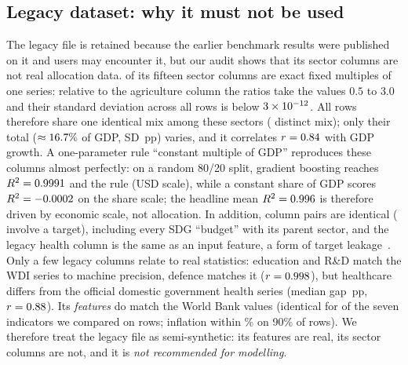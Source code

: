 \documentclass[11pt,a4paper]{article}
\DeclareRobustCommand*{\_}{\textunderscore\hskip0pt\relax}
\begin{document}
\subsection{Legacy dataset: why it must not be used}\label{sec:legacy}
The legacy file is retained because the earlier benchmark results were published on it and users may encounter it, but our audit shows that its sector columns are not real allocation data. \DLegMult{} of its fifteen sector columns are exact fixed multiples of one series: relative to the agriculture column the ratios take the values $0.5$ to $3.0$ and their standard deviation across all \DLegacyRows{} rows is below $3\times10^{-12}$. All rows therefore share one identical mix among these sectors (\DLegMixes{} distinct mix); only their total ($\approx16.7\%$ of GDP, SD \DLegLatentSd\,pp) varies, and it correlates $r=0.84$ with GDP growth. A one-parameter rule ``constant multiple of GDP'' reproduces these columns almost perfectly: on a random 80/20 split, gradient boosting reaches $R^2=0.9991$ and the rule \DBmLegFormulaRConst{} (USD scale), while a constant share of GDP scores $R^2=-0.0002$ on the share scale; the headline mean $R^2=0.996$ is therefore driven by economic scale, not allocation. In addition, \DLegIdent{} column pairs are identical (\DLegIdentTargets{} involve a target), including every SDG ``budget'' with its parent sector, and the legacy health column is the same as an input feature, a form of target leakage~\cite{kaufman2012,kapoor2023}. Only a few legacy columns relate to real statistics: education and R\&D match the WDI series to machine precision, defence matches it ($r=0.998$), but healthcare differs from the official domestic government health series (median gap \DLegHealthGap\,pp, $r=0.88$). Its \emph{features} do match the World Bank values (identical for \DLegExactFeat{} of the seven indicators we compared on \DLegFeatN{} rows; inflation within \DLegInflPninety\% on 90\% of rows). We therefore treat the legacy file as semi-synthetic: its features are real, its sector columns are not, and it is \emph{not recommended for modelling}.
\end{document}
